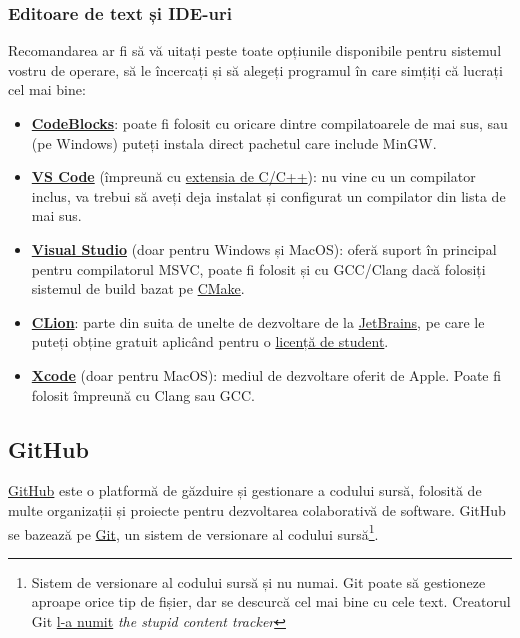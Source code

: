 \subsubsection*{Editoare de text și IDE-uri}

Recomandarea ar fi să vă uitați peste toate opțiunile disponibile pentru sistemul vostru de operare, să le încercați și să alegeți programul în care simțiți că lucrați cel mai bine:

\begin{itemize}
    \item \href{https://www.codeblocks.org/}{\textbf{CodeBlocks}}: poate fi folosit cu oricare dintre compilatoarele de mai sus, sau (pe Windows) puteți instala direct pachetul care include MinGW.

    \item \href{https://code.visualstudio.com/}{\textbf{VS Code}} (împreună cu \href{https://marketplace.visualstudio.com/items?itemName=ms-vscode.cpptools}{extensia de C/C++}): nu vine cu un compilator inclus, va trebui să aveți deja instalat și configurat un compilator din lista de mai sus.

    \item \href{https://visualstudio.microsoft.com/}{\textbf{Visual Studio}} (doar pentru Windows și MacOS): oferă suport în principal pentru compilatorul MSVC, poate fi folosit și cu GCC/Clang dacă folosiți sistemul de build bazat pe \href{https://cmake.org/}{CMake}.

    \item \href{https://www.jetbrains.com/clion/}{\textbf{CLion}}: parte din suita de unelte de dezvoltare de la \href{https://www.jetbrains.com/}{JetBrains}, pe care le puteți obține gratuit aplicând pentru o \href{https://www.jetbrains.com/community/education/#students}{licență de student}.

    \item \href{https://developer.apple.com/xcode/}{\textbf{Xcode}} (doar pentru MacOS): mediul de dezvoltare oferit de Apple. Poate fi folosit împreună cu Clang sau GCC.
\end{itemize}

\subsection*{GitHub}

\href{https://github.com/}{GitHub} este o platformă de găzduire și gestionare a codului sursă, folosită de multe organizații și proiecte pentru dezvoltarea colaborativă de software. GitHub se bazează pe \href{https://git-scm.com/}{Git}, un sistem de versionare al codului sursă\footnote{Sistem de versionare al codului sursă și nu numai. Git poate să gestioneze aproape orice tip de fișier, dar se descurcă cel mai bine cu cele text. Creatorul Git \href{https://qr.ae/preQJt}{l-a numit} \textit{the stupid content tracker}}.

